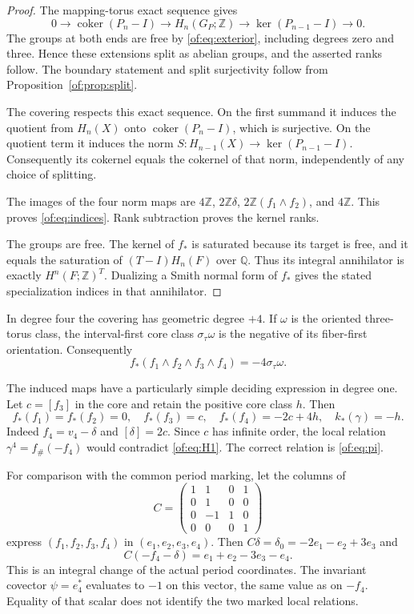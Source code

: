 \begin{proof}
The mapping-torus exact sequence gives
\[
 0\to\operatorname{coker}(P_n-I)\to H_n(G_P;\mathbb Z)
   \to\ker(P_{n-1}-I)\to0.
\]
The groups at both ends are free by \eqref{of:eq:exterior}, including
degrees zero and three. Hence these extensions split as abelian groups,
and the asserted ranks follow. The boundary statement and split
surjectivity follow from Proposition~\ref{of:prop:split}.

The covering respects this exact sequence. On the first summand it induces
the quotient from $H_n(X)$ onto $\operatorname{coker}(P_n-I)$, which is
surjective. On the quotient term it induces the norm
$S:H_{n-1}(X)\to\ker(P_{n-1}-I)$.
Consequently its cokernel equals the cokernel of that norm, independently
of any choice of splitting.

The images of the four norm maps are
$4\mathbb Z$, $2\mathbb Z\delta$, $2\mathbb Z(f_1\wedge f_2)$,
and $4\mathbb Z$.
This proves \eqref{of:eq:indices}. Rank subtraction proves the kernel ranks.

The groups are free. The kernel of $f_*$ is saturated because its target
is free, and it equals the saturation of $(T-I)H_n(F)$ over $\mathbb Q$.
Thus its integral annihilator is exactly $H^n(F;\mathbb Z)^T$.
Dualizing a Smith normal form of $f_*$ gives the stated specialization
indices in that annihilator.
\end{proof}

In degree four the covering has geometric degree $+4$.
If $\omega$ is the oriented three-torus class, the interval-first core
class $\sigma_\tau\omega$ is the negative of its fiber-first orientation.
Consequently
\[
                  f_*(f_1\wedge f_2\wedge f_3\wedge f_4)
                        =-4\sigma_\tau\omega.
\]

The induced maps have a particularly simple deciding expression in degree one.
Let $c=[f_3]$ in the core and retain the positive core class $h$.
Then
\begin{equation}\label{of:eq:H1}
 f_*(f_1)=f_*(f_2)=0,\quad f_*(f_3)=c,\quad
 f_*(f_4)=-2c+4h,\quad k_*(\gamma)=-h.
\end{equation}
Indeed $f_4=v_4-\delta$ and $[\delta]=2c$.
Since $c$ has infinite order, the local relation
$\gamma^4=f_\#(-f_4)$ would contradict \eqref{of:eq:H1}.
The correct relation is \eqref{of:eq:pi}.

For comparison with the common period marking, let the columns of
\[
 C=\begin{pmatrix}1&1&0&1\\0&1&0&0\\0&-1&1&0\\0&0&0&1\end{pmatrix}
\]
express $(f_1,f_2,f_3,f_4)$ in $(e_1,e_2,e_3,e_4)$.
Then $C\delta=\delta_0=-2e_1-e_2+3e_3$ and
\begin{equation}\label{of:eq:common-vector}
 C(-f_4-\delta)=e_1+e_2-3e_3-e_4.
\end{equation}
This is an integral change of the actual period coordinates.
The invariant covector $\psi=e_4^*$ evaluates to $-1$ on this vector,
the same value as on $-f_4$. Equality of that scalar does not identify
the two marked local relations.

